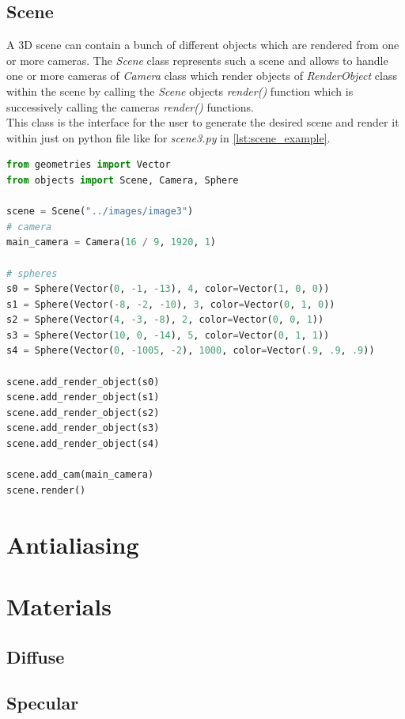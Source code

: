 \documentclass[]{article}
\begin{document}
	\subsection{Scene}
	\label{sec:scene}
	A 3D scene can contain a bunch of different objects which are rendered from one or more cameras. The \emph{Scene} class represents such a scene and allows to handle one or more cameras of \emph{Camera} class which render objects of \emph{RenderObject} class within the scene by calling the \emph{Scene} objects \emph{render()} function which is successively calling the cameras \emph{render()} functions. 
	\\
	This class is the interface for the user to generate the desired scene and render it within just on python file like for \emph{scene3.py} in \cref{lst:scene_example}.
	\begin{lstlisting}[caption={Example for Scene class usage from scene3.py}, language=Python, label=lst:scene_example]
from geometries import Vector
from objects import Scene, Camera, Sphere

scene = Scene("../images/image3")
# camera
main_camera = Camera(16 / 9, 1920, 1)

# spheres
s0 = Sphere(Vector(0, -1, -13), 4, color=Vector(1, 0, 0))
s1 = Sphere(Vector(-8, -2, -10), 3, color=Vector(0, 1, 0))
s2 = Sphere(Vector(4, -3, -8), 2, color=Vector(0, 0, 1))
s3 = Sphere(Vector(10, 0, -14), 5, color=Vector(0, 1, 1))
s4 = Sphere(Vector(0, -1005, -2), 1000, color=Vector(.9, .9, .9))

scene.add_render_object(s0)
scene.add_render_object(s1)
scene.add_render_object(s2)
scene.add_render_object(s3)
scene.add_render_object(s4)

scene.add_cam(main_camera)
scene.render()
	\end{lstlisting}
	
	\section{Antialiasing}
	\section{Materials}
		\subsection{Diffuse}
		\subsection{Specular}
\end{document}

